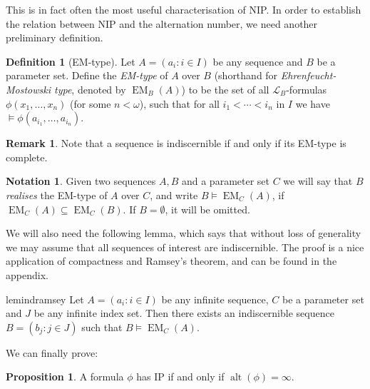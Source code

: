\documentclass[a4paper]{report}
\newcommand{\ind}{\hspace{15pt}}
\renewcommand{\L}{\mathcal{L}}
\DeclareMathOperator{\EM}{EM}
\DeclareMathOperator{\alt}{alt}
\theoremstyle{definition}
\newtheorem{prop}[thm]{Proposition}
\newtheorem{defn}[thm]{Definition}
\theoremstyle{remstyle}
\newtheorem{rem}[thm]{Remark}
\newtheorem*{notation}{Notation}
\begin{document}
\ind This is in fact often the most useful characterisation of NIP. In order to establish the relation between NIP and the alternation number, we need another preliminary definition.

\begin{defn}[EM-type]
	Let $A=(a_i:i\in I)$ be any sequence and $B$ be a parameter set. Define the \emph{EM-type} of $A$ over $B$ (shorthand for \emph{Ehrenfeucht-Mostowski type}, denoted by $\EM_B(A)$) to be the set of all $\L_B$-formulas $\phi(x_1,\ldots,x_n)$ (for some $n<\omega$), such that for all $i_1<\cdots<i_n$ in $I$ we have $\models \phi(a_{i_1},\ldots,a_{i_n})$.
\end{defn}

\begin{rem}
	Note that a sequence is indiscernible if and only if its EM-type is complete.
\end{rem}

\begin{notation}
	Given two sequences $A,B$ and a parameter set $C$ we will say that $B$ \emph{realises} the EM-type of $A$ over $C$, and write $B\models \EM_C(A)$, if $\EM_C(A)\subseteq\EM_C(B)$. If $B=\emptyset$, it will be omitted.
\end{notation}

\ind We will also need the following lemma, which says that without loss of generality we may assume that all sequences of interest are indiscernible. The proof is a nice application of compactness and Ramsey's theorem, and can be found in the appendix.

\begin{restatable}[]{lem}{indramsey}\label{indramsey}
	Let $A=(a_i:i\in I)$ be any infinite sequence, $C$ be a parameter set and $J$ be any infinite index set. Then there exists an indiscernible sequence $B=(b_j:j\in J)$ such that $B\models \EM_C(A)$.
\end{restatable}

\ind We can finally prove:

\begin{prop}\label{ipalt}
	A formula $\phi$ has IP if and only if $\alt(\phi)=\infty$.
\end{prop}
\end{document}
